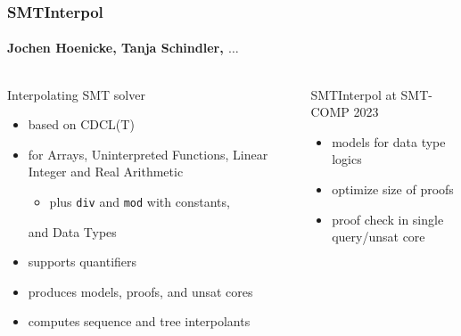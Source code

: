 \documentclass[table,aspectratio=169]{beamer}
\institute[Uni Freiburg]{University of Freiburg\hspace{1cm}\pgfuseimage{unifr}}
\begin{document}
\begin{frame}
  \frametitle{SMTInterpol}
  \framesubtitle{Jochen Hoenicke, Tanja Schindler, $\ldots$}
  
  \vspace{1ex}
  \begin{columns}[t]
  \begin{column}{.5\textwidth}
  Interpolating SMT solver
    \begin{itemize}
    \item based on CDCL(T)
      
    \item for Arrays, Uninterpreted Functions, Linear Integer and Real Arithmetic
    \begin{itemize}
      \item plus \texttt{div} and \texttt{mod} with constants,
    \end{itemize}
    and Data Types
    
    \item supports quantifiers
    
    \item produces models, proofs, and unsat cores
    
    \item computes sequence and tree interpolants
    \end{itemize}
  \end{column}
  
  \hfill\textcolor{ALUblue}{\vrule width 1pt }\hfill{}
  
  \begin{column}{.5\textwidth}
    SMTInterpol at SMT-COMP 2023
    \begin{itemize}
    \item \alert{models} for \alert{data type} logics

    \item optimize size of \alert{proofs}
      
    \item \alert{proof check} in single query/unsat core
    
    \end{itemize}


\end{column}
\end{columns}
\end{frame}
\end{document}
